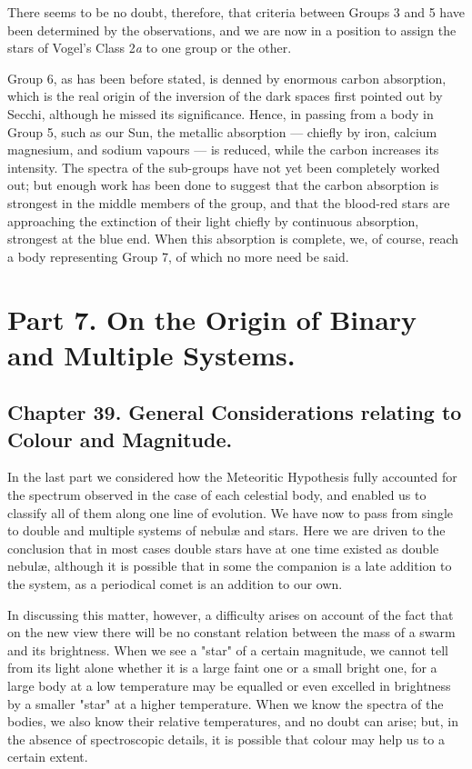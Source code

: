 \documentclass[a4paper, 12pt, oneside, polutonikogreek, english]{article}
\begin{document}
There seems to be no doubt, therefore, that criteria between Groups 3 and 5 have been determined by the observations, and we are now in a position to assign the stars of Vogel's Class 2\emph{a} to one group or the other.

Group 6, as has been before stated, is denned by enormous carbon absorption, which is the real origin of the inversion of the dark spaces first pointed out by Secchi, although he missed its significance. Hence, in passing from a body in Group 5, such as our Sun, the metallic absorption --- chiefly by iron, calcium magnesium, and sodium vapours --- is reduced, while the carbon increases its intensity. The spectra of the sub-groups have not yet been completely worked out; but enough work has been done to suggest that the carbon absorption is strongest in the middle members of the group, and that the blood-red stars are approaching the extinction of their light chiefly by continuous absorption, strongest at the blue end. When this absorption is complete, we, of course, reach a body representing Group 7, of which no more need be said.

\section{Part 7. On the Origin of Binary and Multiple Systems.}

\subsection{Chapter 39. General Considerations relating to Colour and Magnitude.}

In the last part we considered how the Meteoritic Hypothesis fully accounted for the spectrum observed in the case of each celestial body, and enabled us to classify all of them along one line of evolution. We have now to pass from single to double and multiple systems of nebulæ and stars. Here we are driven to the conclusion that in most cases double stars have at one time existed as double nebulæ, although it is possible that in some the companion is a late addition to the system, as a periodical comet is an addition to our own.

In discussing this matter, however, a difficulty arises on account of the fact that on the new view there will be no constant relation between the mass of a swarm and its brightness. When we see a "star" of a certain magnitude, we cannot tell from its light alone whether it is a large faint one or a small bright one, for a large body at a low temperature may be equalled or even excelled in brightness by a smaller "star" at a higher temperature. When we know the spectra of the bodies, we also know their relative temperatures, and no doubt can arise; but, in the absence of spectroscopic details, it is possible that colour may help us to a certain extent.
\end{document}
